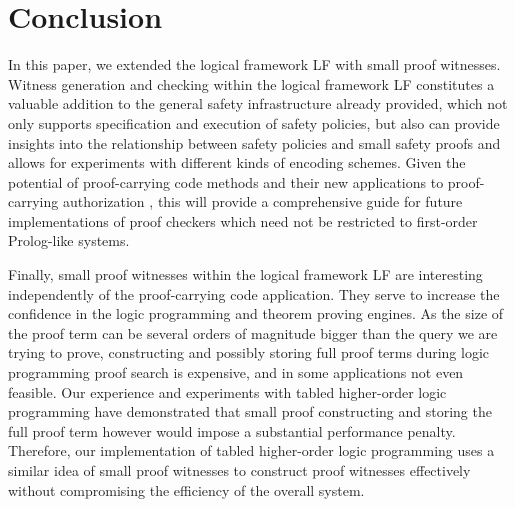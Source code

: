 \documentclass{llncs}
\begin{document}

\section{Conclusion}
In this paper, we extended the logical framework LF with small proof
witnesses. Witness generation and checking  within the logical
framework LF constitutes a valuable addition to the general safety
infrastructure already provided, which not only supports
specification and execution of safety policies, but also can provide
insights into the relationship between safety policies and small
safety proofs and allows for experiments with different kinds of
encoding schemes.
 Given the potential of 
proof-carrying code methods and their new applications to
proof-carrying authorization \cite{AppelFelten99,bauer:thesis}, this
will provide a comprehensive guide for future implementations of proof
checkers which need not be restricted to first-order Prolog-like systems. 

Finally, small proof witnesses within the logical framework LF are
interesting independently of the proof-carrying code application. They
serve to increase the confidence in the logic programming and theorem
proving engines. As the size of the proof term can be
several orders of magnitude bigger than the query we are trying to
prove, constructing and possibly storing full proof terms during logic
programming proof search is expensive, and in some applications not even
feasible. Our experience and experiments with tabled higher-order
logic programming \cite{Pientka03phd} have demonstrated that
small proof  constructing and storing the full proof term 
however would  impose a substantial performance penalty. Therefore,
our implementation of tabled higher-order logic programming uses a
similar idea of small proof witnesses to construct proof witnesses
effectively without compromising the efficiency of the overall
system. 




\end{document}
